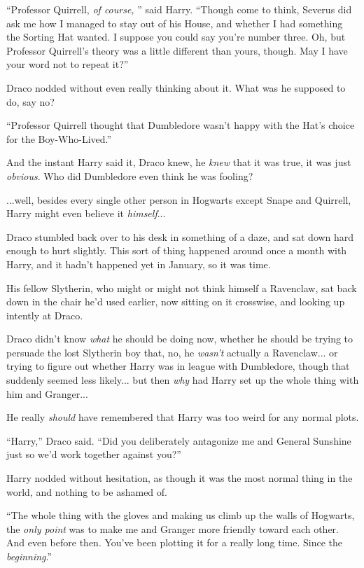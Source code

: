 ``Professor Quirrell, \emph{of course,} '' said Harry. ``Though come to
think, Severus did ask me how I managed to stay out of his House, and
whether I had something the Sorting Hat wanted. I suppose you could say
you're number three. Oh, but Professor Quirrell's theory was a little
different than yours, though. May I have your word not to repeat it?''

Draco nodded without even really thinking about it. What was he supposed
to do, say no?

``Professor Quirrell thought that Dumbledore wasn't happy with the Hat's
choice for the Boy-Who-Lived.''

And the instant Harry said it, Draco knew, he \emph{knew} that it was
true, it was just \emph{obvious}. Who did Dumbledore even think he was
fooling?

...well, besides every single other person in Hogwarts except Snape
and Quirrell, Harry might even believe it \emph{himself}...

Draco stumbled back over to his desk in something of a daze, and sat
down hard enough to hurt slightly. This sort of thing happened around
once a month with Harry, and it hadn't happened yet in January, so it
was time.

His fellow Slytherin, who might or might not think himself a Ravenclaw,
sat back down in the chair he'd used earlier, now sitting on it
crosswise, and looking up intently at Draco.

Draco didn't know \emph{what} he should be doing now, whether he should
be trying to persuade the lost Slytherin boy that, no, he \emph{wasn't}
actually a Ravenclaw... or trying to figure out whether Harry was
in league with Dumbledore, though that suddenly seemed less
likely... but then \emph{why} had Harry set up the whole thing with
him and Granger...

He really \emph{should} have remembered that Harry was too weird for any
normal plots.

``Harry,'' Draco said. ``Did you deliberately antagonize me and General
Sunshine just so we'd work together against you?''

Harry nodded without hesitation, as though it was the most normal thing
in the world, and nothing to be ashamed of.

``The whole thing with the gloves and making us climb up the walls of
Hogwarts, the \emph{only point} was to make me and Granger more friendly
toward each other. And even before then. You've been plotting it for a
really long time. Since the \emph{beginning}.''

